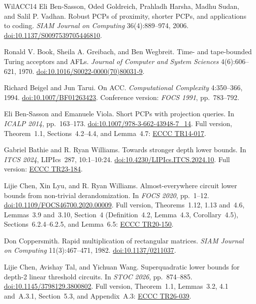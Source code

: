 \documentclass[11pt,letterpaper]{article}
\theoremstyle{definition}
\theoremstyle{remark}
\begin{document}
\begin{thebibliography}{WilACC14}
Eli Ben-Sasson, Oded Goldreich, Prahladh Harsha, Madhu Sudan,
and Salil P. Vadhan. Robust PCPs of proximity, shorter PCPs, and
applications to coding. \emph{SIAM Journal on Computing}
36(4):889--974, 2006.
\href{https://doi.org/10.1137/S0097539705446810}{doi:10.1137/S0097539705446810}.

Ronald V. Book, Sheila A. Greibach, and Ben Wegbreit.
Time- and tape-bounded Turing acceptors and AFLs.
\emph{Journal of Computer and System Sciences} 4(6):606--621, 1970.
\href{https://doi.org/10.1016/S0022-0000(70)80031-9}{doi:10.1016/S0022-0000(70)80031-9}.

Richard Beigel and Jun Tarui. On ACC.
\emph{Computational Complexity} 4:350--366, 1994.
\href{https://doi.org/10.1007/BF01263423}{doi:10.1007/BF01263423}.
Conference version: \emph{FOCS 1991}, pp.~783--792.

Eli Ben-Sasson and Emanuele Viola. Short PCPs with projection queries.
In \emph{ICALP 2014}, pp.~163--173.
\href{https://doi.org/10.1007/978-3-662-43948-7_14}{doi:10.1007/978-3-662-43948-7\_14}.
Full version, Theorem~1.1, Sections~4.2--4.4, and Lemma~4.7:
\href{https://eccc.weizmann.ac.il/report/2014/017/}{ECCC TR14-017}.

Gabriel Bathie and R. Ryan Williams. Towards stronger depth lower
bounds. In \emph{ITCS 2024}, LIPIcs~287, 10:1--10:24.
\href{https://doi.org/10.4230/LIPIcs.ITCS.2024.10}{doi:10.4230/LIPIcs.ITCS.2024.10}.
Full version: \href{https://eccc.weizmann.ac.il/report/2023/184/}{ECCC TR23-184}.

Lijie Chen, Xin Lyu, and R. Ryan Williams.
Almost-everywhere circuit lower bounds from non-trivial derandomization.
In \emph{FOCS 2020}, pp.~1--12.
\href{https://doi.org/10.1109/FOCS46700.2020.00009}{doi:10.1109/FOCS46700.2020.00009}.
Full version, Theorems~1.12, 1.13 and~4.6, Lemmas~3.9 and~3.10, Section~4
(Definition~4.2, Lemma~4.3, Corollary~4.5), Sections~6.2.4--6.2.5, and
Lemma~6.5:
\href{https://eccc.weizmann.ac.il/report/2020/150/}{ECCC TR20-150}.

Don Coppersmith. Rapid multiplication of rectangular matrices.
\emph{SIAM Journal on Computing} 11(3):467--471, 1982.
\href{https://doi.org/10.1137/0211037}{doi:10.1137/0211037}.

Lijie Chen, Avishay Tal, and Yichuan Wang.
Superquadratic lower bounds for depth-2 linear threshold circuits.
In \emph{STOC 2026}, pp.~874--885.
\href{https://doi.org/10.1145/3798129.3800802}{doi:10.1145/3798129.3800802}.
Full version, Theorem~1.1, Lemmas~3.2, 4.1 and~A.3.1, Section~5.3,
and Appendix~A.3:
\href{https://eccc.weizmann.ac.il/report/2026/039/}{ECCC TR26-039}.


\end{thebibliography}
\end{document}
